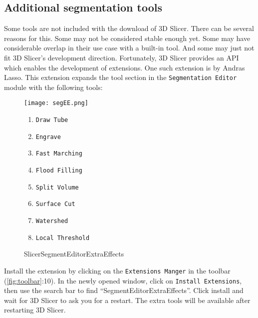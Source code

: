 \subsection{Additional segmentation tools}
Some tools are not included with the download of 3D Slicer.
There can be several reasons for this.
Some may not be considered stable enough yet.
Some may have considerable overlap in their use case with a built-in tool.
And some may just not fit 3D Slicer's development direction.
Fortunately, 3D Slicer provides an API which enables the development of extensions.
One such extension is \cite{lassoSlicerSegmentEditorExtraEffects2024} by Andras Lasso.
This extension expands the tool section in the \texttt{Segmentation Editor} module with the following tools:
\begin{figure}[h]
	\begin{minipage}{0.4\textwidth}
		\centering
		\texttt{[image: segEE.png]}
		\caption{SlicerSegmentEditorExtraEffects}\label{segEE}
	\end{minipage}%
	\begin{minipage}{0.5\textwidth}
		\begin{enumerate} %
			\item \texttt{Draw Tube}
			\item \texttt{Engrave}
			\item \texttt{Fast Marching}
			\item \texttt{Flood Filling}
			\item \texttt{Split Volume}
			\item \texttt{Surface Cut}
			\item \texttt{Watershed}
			\item \texttt{Local Threshold}
		\end{enumerate}
	\end{minipage}
\end{figure}
\mbox{}

\noindent
Install the extension by clicking on the \texttt{Extensions Manger} in the toolbar (\cref{fig:toolbar}:10).
In the newly opened window, click on \texttt{Install Extensions}, then use the search bar to find ``SegmentEditorExtraEffects''.
Click install and wait for 3D Slicer to ask you for a restart.
The extra tools will be available after restarting 3D Slicer.

\pagebreak
